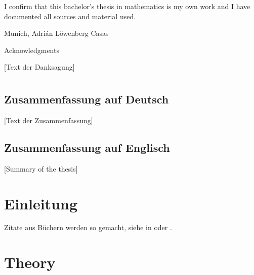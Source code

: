 \documentclass[headsepline,footsepline,footinclude=false,oneside,fontsize=11pt,paper=a4,listof=totoc,bibliography=totoc]{scrbook} %
\begin{document}
\thispagestyle{empty}
\vspace*{0.70\textheight}
\noindent
I confirm that this bachelor’s thesis in mathematics is my own work and I have
documented all sources and material used.

\vspace{30mm}
Munich,\hspace{80mm} Adrián Löwenberg Casas
\enlargethispage{10\baselineskip}
\newpage

\thispagestyle{empty}

\vspace*{20mm}

\begin{center}
	{ Acknowledgments}
\end{center}

\vspace{10mm}
\pagestyle{headings}
[Text der Danksagung]
\newpage

\chapter*{}
\vspace*{-2.2cm}
\section*{Zusammenfassung auf Deutsch}
[Text der Zusammenfassung]
\section*{Zusammenfassung auf Englisch}
[Summary of the thesis]
\newpage
{}
\tableofcontents{}


\chapter{Einleitung}  \setcounter{page}{1}   %
Zitate aus B\"uchern werden so gemacht, siehe in \cite{schoenbucher03} oder \cite{marshall67}.

\chapter{Theory}
\end{document}
